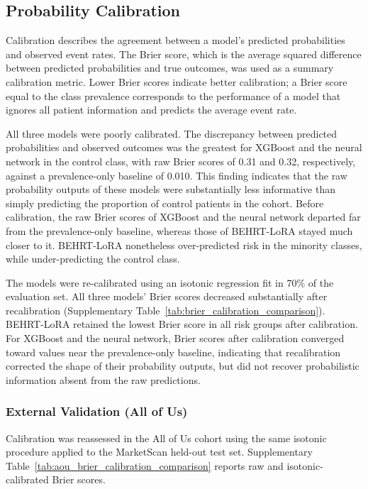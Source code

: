 \documentclass[12pt]{article}
\begin{document}
\subsection{Probability Calibration}

Calibration describes the agreement between a model's predicted probabilities and observed event rates. The Brier score, which is the average squared difference between predicted probabilities and true outcomes, was used as a summary calibration metric. Lower Brier scores indicate better calibration; a Brier score equal to the class prevalence corresponds to the performance of a model that ignores all patient information and predicts the average event rate.

All three models were poorly calibrated. The discrepancy between predicted probabilities and observed outcomes was the greatest for XGBoost and the neural network in the control class, with raw Brier scores of 0.31 and 0.32, respectively, against a prevalence-only baseline of 0.010. This finding indicates that the raw probability outputs of these models were substantially less informative than simply predicting the proportion of control patients in the cohort. Before calibration, the raw Brier scores of XGBoost and the neural network departed far from the prevalence-only baseline, whereas those of BEHRT-LoRA stayed much closer to it. BEHRT-LoRA nonetheless over-predicted risk in the minority classes, while under-predicting the control class.

The models were re-calibrated using an isotonic regression fit in 70\% of the evaluation set. All three models' Brier scores decreased substantially after recalibration (Supplementary Table~\ref{tab:brier_calibration_comparison}). BEHRT-LoRA retained the lowest Brier score in all risk groups after calibration. For XGBoost and the neural network, Brier scores after calibration converged toward values near the prevalence-only baseline, indicating that recalibration corrected the shape of their probability outputs, but did not recover probabilistic information absent from the raw predictions.

\subsubsection{External Validation (All of Us)}

Calibration was reassessed in the All of Us cohort using the same isotonic procedure applied to the MarketScan held-out test set. Supplementary Table~\ref{tab:aou_brier_calibration_comparison} reports raw and isotonic-calibrated Brier scores.
\end{document}
